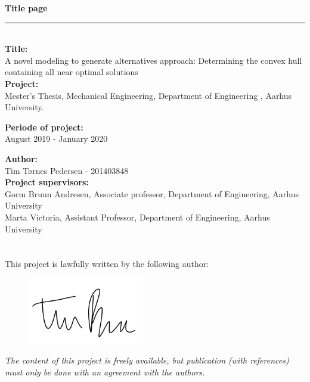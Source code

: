
\vspace{3.5cm}
{\Huge\textbf{Title page}} \\
\rule{1.0\textwidth}{0.1mm}\\ %

\textbf{Title:}\\
A novel modeling to generate alternatives approach: Determining the convex hull containing all near optimal solutions \\

\textbf{Project:}\\
Mester's Thesis, Mechanical Engineering, Department of Engineering , Aarhus University.

\textbf{Periode of project:}\\ August 2019 - January 2020

\textbf{Author:}\\ 
Tim Tørnes Pedersen - 201403848\\

\textbf{Project supervisors:}\\
Gorm Bruun Andresen, Associate professor,  Department of Engineering, Aarhus University\\ 
Marta Victoria, Assistant Professor, Department of Engineering, Aarhus University\\\\ \\


This project is lawfully written by the following author:

\begin{figure}[H]
\includegraphics[width=0.45\textwidth]{./Images/underskrift}
\end{figure}



\textit{The content of this project is freely available, but publication (with references) must only be done with an agreement with the authors.}

\newpage
